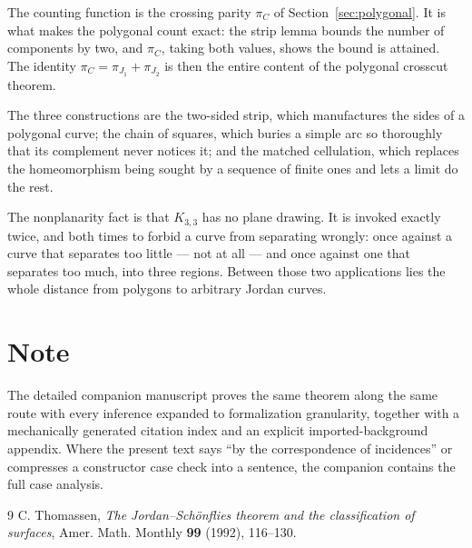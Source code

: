 \documentclass[11pt,a4paper]{article}
\theoremstyle{jsplain}
\theoremstyle{jsdefn}
\begin{document}
The counting function is the crossing parity $\pi_C$ of
Section~\ref{sec:polygonal}. It is what makes the polygonal count exact:
the strip lemma bounds the number of components by two, and $\pi_C$,
taking both values, shows the bound is attained. The identity
$\pi_C=\pi_{J_1}+\pi_{J_2}$ is then the entire content of the polygonal
crosscut theorem.

The three constructions are the two-sided strip, which manufactures the
sides of a polygonal curve; the chain of squares, which buries a simple
arc so thoroughly that its complement never notices it; and the matched
cellulation, which replaces the homeomorphism being sought by a sequence
of finite ones and lets a limit do the rest.

The nonplanarity fact is that $K_{3,3}$ has no plane drawing. It is
invoked exactly twice, and both times to forbid a curve from separating
wrongly: once against a curve that separates too little --- not at all
--- and once against one that separates too much, into three regions.
Between those two applications lies the whole distance from polygons to
arbitrary Jordan curves.

\section*{Note}
The detailed companion manuscript proves the same theorem along the
same route with every inference expanded to formalization granularity,
together with a mechanically generated citation index and an explicit
imported-background appendix. Where the present text says ``by the
correspondence of incidences'' or compresses a constructor case check
into a sentence, the companion contains the full case analysis.

\begin{thebibliography}{9}
C. Thomassen, \emph{The Jordan--Schönflies theorem and the
classification of surfaces}, Amer. Math. Monthly \textbf{99} (1992),
116--130.
\end{thebibliography}
\end{document}

